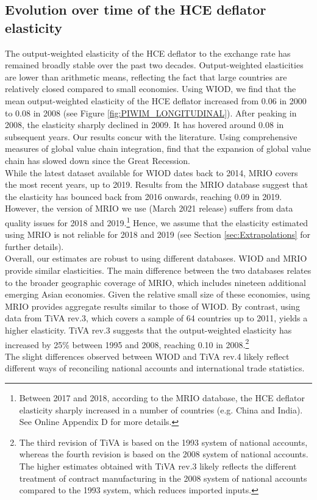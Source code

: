 \documentclass[11pt,a4paper]{paper} %
\begin{document}
\subsection{Evolution over time of the HCE deflator elasticity}\label{subsec:timeevol}
The output-weighted elasticity of the HCE deflator to the exchange rate has remained broadly stable over the past two decades.
Output-weighted elasticities are lower than arithmetic means, reflecting the fact that large countries are relatively closed compared to small economies.
Using WIOD, we find that the mean output-weighted elasticity of the HCE deflator increased from 0.06 in 2000 to 0.08 in 2008 (see Figure \ref{fig:PIWIM_LONGITUDINAL}). 
After peaking in 2008, the elasticity sharply declined in 2009. It has hovered around 0.08 in subsequent years. 
Our results concur with the literature.
Using comprehensive measures of global value chain integration, \cite{Timmer2016} find that the expansion of global value chain has slowed down since the Great Recession.\\
While the latest dataset available for WIOD dates back to 2014, MRIO covers the most recent years, up to 2019. 
Results from the MRIO database suggest that the elasticity has bounced back from 2016 onwards, reaching 0.09 in 2019.
However, the version of MRIO we use (March 2021 release) suffers from data quality issues for 2018 and 2019.\footnote{Between 2017 and 2018, according to the MRIO database, the HCE deflator elasticity sharply increased in a number of countries (e.g. China and India). See Online Appendix D for more details.} 
Hence, we assume that the elasticity estimated using MRIO is not reliable for 2018 and 2019 (see Section \ref{sec:Extrapolations} for further details).\\
Overall, our estimates are robust to using different databases.
WIOD and MRIO provide similar elasticities. 
The main difference between the two databases relates to the broader geographic coverage of MRIO, which includes nineteen additional emerging Asian economies. 
Given the relative small size of these economies, using MRIO provides aggregate results similar to those of WIOD.
By contrast, using data from TiVA rev.3, which covers a sample of 64 countries up to 2011, yields a higher elasticity. 
TiVA rev.3 suggests that the output-weighted elasticity has increased by 25\% between 1995 and 2008, reaching 0.10 in 2008.\footnote{The third revision of TiVA is based on the 1993 system of national accounts, whereas the fourth revision is based on the 2008 system of national accounts. The higher estimates obtained with TiVA rev.3 likely reflects the different treatment of contract manufacturing in the 2008 system of national accounts compared to the 1993 system, which reduces imported inputs.} \\
The slight differences observed between WIOD and TiVA rev.4 likely reflect different ways of reconciling national accounts and international trade statistics.
\end{document}

